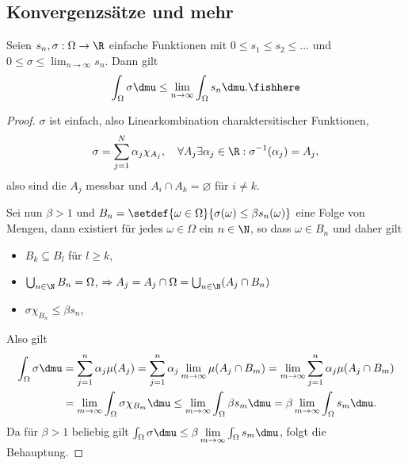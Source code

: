 \subsection{Konvergenzsätze und mehr}

\begin{prop}
\label{prop:3.31}
Seien $s_n,\sigma: \Omega\to\R$ einfache Funktionen mit $0\le s_1\le s_2\le
\ldots$ und $0\le \sigma\le \lim_{n\to\infty} s_n$. Dann gilt
\begin{align*}
\int_\Omega \sigma\dmu \le \lim\limits_{n\to \infty} \int_\Omega
s_n\dmu.\fishhere
\end{align*}
\end{prop}
\begin{proof}
$\sigma$ ist einfach, also Linearkombination charaktersitischer Funktionen,
\begin{align*}
\sigma = \sum\limits_{j=1}^N \alpha_j \chi_{A_j},\quad \forall A_j \exists
\alpha_j \in\R : \sigma^{-1}(\alpha_j) = A_j,
\end{align*}
also sind die $A_j$ messbar und $A_i\cap A_k =\varnothing$ für $i\neq k$.

Sei nun $\beta>1$ und $B_n = \setdef{\omega\in\Omega}{\sigma(\omega) \le \beta
s_n(\omega)}$ eine Folge von Mengen, dann existiert für jedes $\omega\in\Omega$
ein $n\in\N$, so dass $\omega\in B_n$ und daher gilt
\begin{itemize}
  \item $B_k \subseteq B_l$ für $l\ge k$,
  \item $\bigcup_{n\in\N} B_n = \Omega$, $\Rightarrow A_j = A_j\cap\Omega =
  \bigcup_{n\in\N} (A_j\cap B_n)$
  \item $\sigma \chi_{B_n} \le \beta s_n$,
\end{itemize}
Also gilt
\begin{align*}
\int_\Omega \sigma \dmu &= \sum\limits_{j=1}^n \alpha_j \mu(A_j) 
= \sum\limits_{j=1}^n \alpha_j \lim\limits_{m\to\infty} \mu(A_j\cap B_m)
= \lim\limits_{m\to\infty} \sum\limits_{j=1}^n \alpha_j \mu(A_j\cap B_m)
\\ &= \lim\limits_{m\to\infty} \int_\Omega \sigma \chi_{B_m}\dmu
\le  \lim\limits_{m\to\infty} \int_\Omega \beta s_m \dmu
= \beta\lim\limits_{m\to\infty} \int_\Omega s_m \dmu. 
\end{align*}
Da für $\beta >1$ beliebig gilt $\int_\Omega \sigma\dmu \le \beta
\lim\limits_{m\to\infty} \int_\Omega s_m \dmu$, folgt die Behauptung.\qedhere 
\end{proof}

